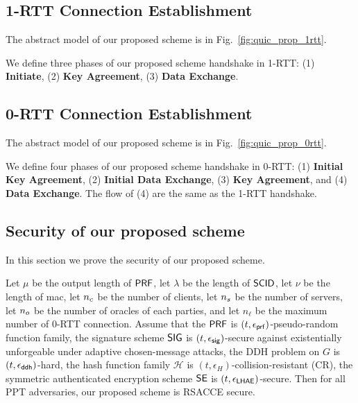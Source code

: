 \subsection{1-RTT Connection Establishment} \label{sec:quic_prop_1rtt}

The abstract model of our proposed scheme is in
Fig.~\ref{fig:quic_prop_1rtt}.



We define three phases of our proposed scheme handshake in 1-RTT:
(1) \textbf{Initiate},
(2) \textbf{Key Agreement},
(3) \textbf{Data Exchange}.





\subsection{0-RTT Connection Establishment} \label{sec:quic_prop_0rtt}

The abstract model of our proposed scheme is in
Fig.~\ref{fig:quic_prop_0rtt}.



We define four phases of our proposed scheme handshake in 0-RTT:
(1) \textbf{Initial Key Agreement},
(2) \textbf{Initial Data Exchange},
(3) \textbf{Key Agreement}, and
(4) \textbf{Data Exchange}.
The flow of (4) are the same as the 1-RTT
handshake.





\subsection{Security of our proposed scheme} \label{sec:quic_proof}

In this section we prove the security of our proposed scheme.

\begin{theorem} \label{theorem:proposed_scheme}
 Let $\mu$ be the output length of $\mathsf{PRF}$, let $\lambda$ be
 the length of $\mathsf{SCID}$, let $\nu$ be the length of mac, let $n_c$ be the number of
 clients, let $n_s$ be the number of servers, let
 $n_o$ be the number of oracles of each parties, and
 let $n_{\ell}$ be the maximum number of 0-RTT connection. Assume
 that the $\mathsf{PRF}$ is $(t, \epsilon_{\mathsf{prf}})$-pseudo-random
 function family, the signature scheme
 $\mathsf{SIG}$ is $(t, \epsilon_{\mathsf{sig}})$-secure against existentially
 unforgeable under adaptive chosen-message attacks, the DDH
 problem on $G$ is $(t, \epsilon_{\mathsf{ddh}})$-hard, the hash
 function family $\mathcal{H}$ is
 $(t,\epsilon_{H})$-collision-resistant (CR), the symmetric
 authenticated encryption scheme $\mathsf{SE}$ is
 $(t, \epsilon_{\mathsf{LHAE}})$-secure.
 Then for all PPT adversaries, our proposed scheme is RSACCE secure.
\end{theorem}

